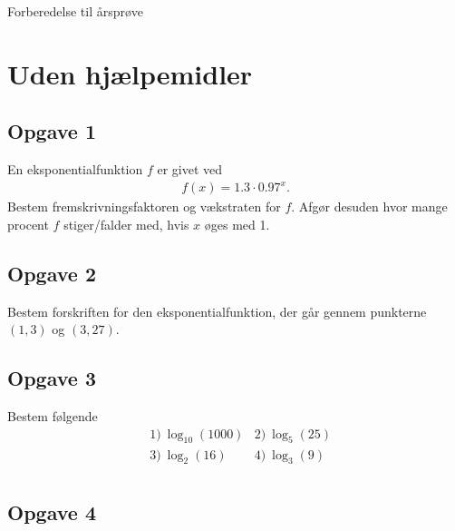 \documentclass[12pt]{article}
\begin{document}



\begin{center}
\Huge
Forberedelse til årsprøve
\end{center}

\section*{Uden hjælpemidler}
\subsection*{Opgave 1}
En eksponentialfunktion $f$ er givet ved
	\begin{align*}
		f(x) = 1.3\cdot 0.97^x.
	\end{align*}
	Bestem fremskrivningsfaktoren og vækstraten for $f$. Afgør desuden hvor mange procent $f$ stiger/falder med, hvis $x$ øges med 1.

\subsection*{Opgave 2}
Bestem forskriften for den eksponentialfunktion, der går gennem punkterne $(1,3)$ og $(3,27)$.

\subsection*{Opgave 3}
Bestem følgende
\begin{align*}
	&1) \  \log_{10}(1000)      &2) \  \log_5(25)       \\
	&3) \  \log_2(16)       &4) \ \log_3(9)         \\
\end{align*}

\newpage

\subsection*{Opgave 4}
\end{document}

